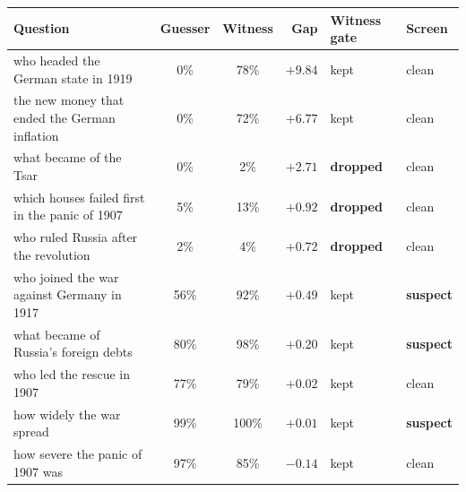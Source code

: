 \begin{tabular}{p{4.9cm}ccr ll}
\toprule
Question & Guesser & Witness & Gap & Witness gate & Screen \\
\midrule
who headed the German state in 1919 & 0\% & 78\% & $+9.84$ & kept & clean \\
the new money that ended the German inflation & 0\% & 72\% & $+6.77$ & kept & clean \\
what became of the Tsar & 0\% & 2\% & $+2.71$ & \textbf{dropped} & clean \\
which houses failed first in the panic of 1907 & 5\% & 13\% & $+0.92$ & \textbf{dropped} & clean \\
who ruled Russia after the revolution & 2\% & 4\% & $+0.72$ & \textbf{dropped} & clean \\
who joined the war against Germany in 1917 & 56\% & 92\% & $+0.49$ & kept & \textbf{suspect} \\
what became of Russia's foreign debts & 80\% & 98\% & $+0.20$ & kept & \textbf{suspect} \\
who led the rescue in 1907 & 77\% & 79\% & $+0.02$ & kept & clean \\
how widely the war spread & 99\% & 100\% & $+0.01$ & kept & \textbf{suspect} \\
how severe the panic of 1907 was & 97\% & 85\% & $-0.14$ & kept & clean \\
\bottomrule
\end{tabular}